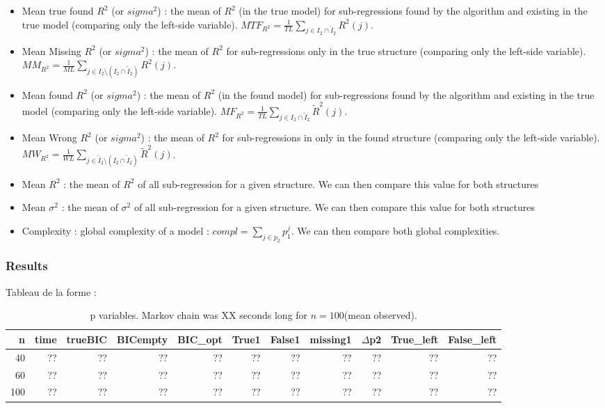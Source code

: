 \documentclass[11pt,a4paper]{article}
\begin{document}
				\begin{itemize}
					\item Mean  true found $R^2$ (or $sigma^2$) : the mean of $R^2$ (in the true model) for sub-regressions found by the algorithm and existing in the true model (comparing only the left-side variable). $MTF_{R^2}=\frac{1}{TL}\sum_{j \in I_2\cap \tilde{I}_2}R^2(j)$.
				\item Mean Missing $R^2$ (or $sigma^2$) : the mean of $R^2$ for sub-regressions  only in the true structure (comparing only the left-side variable).$MM_{R^2}=\frac{1}{ML}\sum_{j \in I_2 \setminus (I_2\cap \tilde{I}_2)}R^2(j)$.
				\item Mean found $R^2$ (or $sigma^2$) : the mean of $R^2$ (in the found model) for sub-regressions found by the algorithm and existing in the true model (comparing only the left-side variable). $MF_{R^2}=\frac{1}{TL}\sum_{j \in I_2\cap \tilde{I}_2}\tilde{R}^2(j)$.
				\item Mean Wrong $R^2$ (or $sigma^2$) : the mean of $R^2$ for sub-regressions in only in the found structure (comparing only the left-side variable).$MW_{R^2}=\frac{1}{WL}\sum_{j \in \tilde{I}_2 \setminus (I_2\cap \tilde{I}_2)}\tilde{R}^2(j)$.
				\item Mean $R^2$ : the mean of $R^2$ of all sub-regression for a given structure. We can then compare this value for both structures
				\item Mean $\sigma^2$ : the mean of $\sigma^2$ of all sub-regression for a given structure. We can then compare this value for both structures
				\item Complexity : global complexity of a model : $compl=\sum_{j \in p_2}p_1^j$. We can then compare both global complexities.
			\end{itemize}
						
			
			
		\subsubsection{Results}	
	Tableau de la forme :	
	\begin{table}[h!]
\centering
\begin{tabular}{|r|rrrr|rrrrrr|}
  \hline
n & time &trueBIC & BICempty & BIC\_opt & True1 & False1 & missing1 & $\Delta$p2 &True\_left & False\_left \\ 
  \hline
40 &??& ?? & ?? & ?? &?? & ?? & ??& ?? &??& ?? \\ 
  60 &??& ?? & ?? & ?? & ?? & ?? & ?? & ?? & ?? & ?? \\ 
  100 &??& ?? & ?? &?? &?? & ?? & ?? &?? & ?? & ?? \\ 
   \hline
\end{tabular}
\caption{p variables. Markov chain was XX seconds long for $n=100$(mean observed). }
\end{table}
\end{document}
